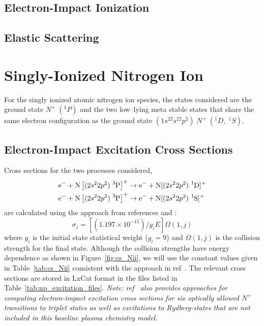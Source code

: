 \subsection{Electron-Impact Ionization} 
\tbd

\subsection{Elastic Scattering}
\tbd

\section{Singly-Ionized Nitrogen Ion}

For the singly ionized atomic nitrogen ion species, the states
considered are the ground state $N^+\;(^3P)$ and the two low–lying
meta stable states that share the same electron configuration as
the ground state $(1s^22s^22p^2)\; N^+\; (^1D,\; ^1S)$. 

\subsection{Electron-Impact Excitation Cross Sections}
Cross sections for the two processes considered,
\begin{align}
		\ce{e-} + \ce{N}\left[(2s^22p^2)\; \ce{^3P}\right]^+ & \rightarrow \ce{e-} +\ce{N}[(2s^22p^2)\; \ce{^1D}]^+\\
		\ce{e-} + \ce{N}\left[(2s^22p^2)\; \ce{^3P}\right]^+ & \rightarrow \ce{e-} +\ce{N}[(2s^22p^2)\; \ce{^1S}]^+
\end{align}
are calculated using the approach from references \cite{henry1969} and \cite{taylor1988}:
\begin{equation}
		\sigma_j = \left[\left(1.197\times 10^{-15}\right)/g_i E\right]\Omega(1,j)
\end{equation}
where $g_i$ is the initial state statistical weight ($g_i = 9$) and $\Omega(1,j)$
is the collision strength for the final state. Although the collision strengths have
energy dependence as shown in Figure~\ref{fig:cs_Nii}, we will use the 
constant values given in Table~\ref{tab:cs_Nii} consistent with the approach in ref~\cite{henry1969}.
The relevant cross sections are stored in LxCat format in the files listed in 
Table~\ref{tab:np_excitation_files}.
\textit{Note: ref~\cite{taylor1988} also provides approaches for computing electron-impact
excitation cross sections for six optically allowed $N^+$ transitions to triplet
states as well as excitations to Rydberg-states that are not included in this baseline
plasma chemistry model.}

